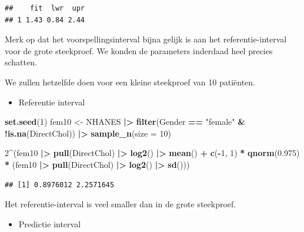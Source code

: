 \documentclass[
  12pt,dutch]{book}
\newenvironment{Shaded}{\begin{snugshade}}{\end{snugshade}}
\newcommand{\AttributeTok}[1]{\textcolor[rgb]{0.13,0.29,0.53}{#1}}
\newcommand{\DecValTok}[1]{\textcolor[rgb]{0.00,0.00,0.81}{#1}}
\newcommand{\FloatTok}[1]{\textcolor[rgb]{0.00,0.00,0.81}{#1}}
\newcommand{\FunctionTok}[1]{\textcolor[rgb]{0.13,0.29,0.53}{\textbf{#1}}}
\newcommand{\NormalTok}[1]{#1}
\newcommand{\OtherTok}[1]{\textcolor[rgb]{0.56,0.35,0.01}{#1}}
\newcommand{\SpecialCharTok}[1]{\textcolor[rgb]{0.81,0.36,0.00}{\textbf{#1}}}
\newcommand{\StringTok}[1]{\textcolor[rgb]{0.31,0.60,0.02}{#1}}
\providecommand{\tightlist}{%
  \setlength{\itemsep}{0pt}\setlength{\parskip}{0pt}}
\theoremstyle{definition}
\theoremstyle{definition}
\theoremstyle{definition}
\theoremstyle{definition}
\theoremstyle{remark}
\begin{document}
\begin{verbatim}
##    fit  lwr  upr
## 1 1.43 0.84 2.44
\end{verbatim}

Merk op dat het voorspellingsinterval bijna gelijk is aan het referentie-interval voor de grote steekproef. We konden de parameters inderdaad heel precies schatten.

We zullen hetzelfde doen voor een kleine steekproef van 10 patiënten.

\begin{itemize}
\tightlist
\item
  Referentie interval
\end{itemize}

\begin{Shaded}
\begin{Highlighting}[]
\FunctionTok{set.seed}\NormalTok{(}\DecValTok{1}\NormalTok{)}
\NormalTok{fem10 }\OtherTok{\textless{}{-}}\NormalTok{ NHANES }\SpecialCharTok{|\textgreater{}}
    \FunctionTok{filter}\NormalTok{(Gender }\SpecialCharTok{==} \StringTok{"female"} \SpecialCharTok{\&} \SpecialCharTok{!}\FunctionTok{is.na}\NormalTok{(DirectChol)) }\SpecialCharTok{|\textgreater{}}
    \FunctionTok{sample\_n}\NormalTok{(}\AttributeTok{size =} \DecValTok{10}\NormalTok{)}

\DecValTok{2}\SpecialCharTok{\^{}}\NormalTok{(fem10 }\SpecialCharTok{|\textgreater{}}
    \FunctionTok{pull}\NormalTok{(DirectChol) }\SpecialCharTok{|\textgreater{}}
    \FunctionTok{log2}\NormalTok{() }\SpecialCharTok{|\textgreater{}}
    \FunctionTok{mean}\NormalTok{() }\SpecialCharTok{+} \FunctionTok{c}\NormalTok{(}\SpecialCharTok{{-}}\DecValTok{1}\NormalTok{, }\DecValTok{1}\NormalTok{) }\SpecialCharTok{*} \FunctionTok{qnorm}\NormalTok{(}\FloatTok{0.975}\NormalTok{) }\SpecialCharTok{*}\NormalTok{ (fem10 }\SpecialCharTok{|\textgreater{}}
    \FunctionTok{pull}\NormalTok{(DirectChol) }\SpecialCharTok{|\textgreater{}}
    \FunctionTok{log2}\NormalTok{() }\SpecialCharTok{|\textgreater{}}
    \FunctionTok{sd}\NormalTok{()))}
\end{Highlighting}
\end{Shaded}

\begin{verbatim}
## [1] 0.8976012 2.2571645
\end{verbatim}

Het referentie-interval is veel smaller dan in de grote steekproef.

\begin{itemize}
\tightlist
\item
  Predictie interval
\end{itemize}
\end{document}
